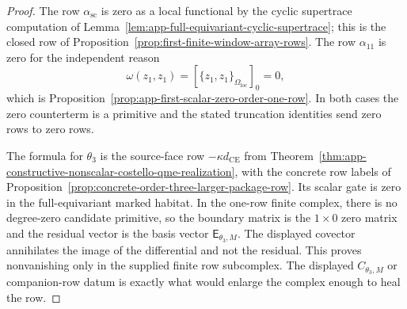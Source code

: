\begin{proof}
  The row \(\alpha_{\mathrm{sc}}\) is zero as a local functional by the
  cyclic supertrace computation of
  Lemma~\ref{lem:app-full-equivariant-cyclic-supertrace}; this is the
  closed row of Proposition~\ref{prop:first-finite-window-array-rows}.
  The row \(\alpha_{11}\) is zero for the independent reason
  \[
    \omega(z_1,z_1)=
    [\{z_1,z_1\}_{\Omega_{\mathrm{loc}}}]_0=0,
  \]
  which is Proposition~\ref{prop:app-first-scalar-zero-order-one-row}.
  In both cases the zero counterterm is a primitive and the stated
  truncation identities send zero rows to zero rows.

  The formula for \(\theta_3\) is the source-face row
  \(-\kappa d_{\mathrm{CE}}\) from
  Theorem~\ref{thm:app-constructive-nonscalar-costello-qme-realization},
  with the concrete row labels of
  Proposition~\ref{prop:concrete-order-three-larger-package-row}.  Its
  scalar gate is zero in the full-equivariant marked habitat.  In the
  one-row finite complex, there is no degree-zero candidate primitive, so
  the boundary matrix is the \(1\times0\) zero matrix and the residual
  vector is the basis vector \(\mathsf E_{\theta_3,M}\).  The displayed
  covector annihilates the image of the differential and not the residual.
  This proves nonvanishing only in the supplied finite row subcomplex.
  The displayed \(C_{\theta_3,M}\) or companion-row datum is exactly what
  would enlarge the complex enough to heal the row.
\end{proof}

